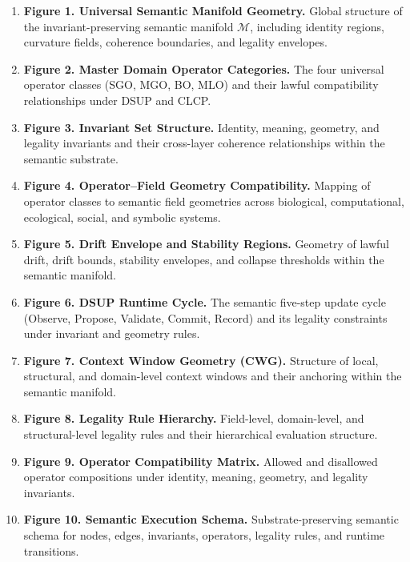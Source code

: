 
\begin{enumerate}
    \item \textbf{Figure 1. Universal Semantic Manifold Geometry.}  
    Global structure of the invariant-preserving semantic manifold $\mathcal{M}$,
    including identity regions, curvature fields, coherence boundaries, and
    legality envelopes.

    \item \textbf{Figure 2. Master Domain Operator Categories.}  
    The four universal operator classes (SGO, MGO, BO, MLO) and their lawful
    compatibility relationships under DSUP and CLCP.

    \item \textbf{Figure 3. Invariant Set Structure.}  
    Identity, meaning, geometry, and legality invariants and their cross-layer
    coherence relationships within the semantic substrate.

    \item \textbf{Figure 4. Operator–Field Geometry Compatibility.}  
    Mapping of operator classes to semantic field geometries across biological,
    computational, ecological, social, and symbolic systems.

    \item \textbf{Figure 5. Drift Envelope and Stability Regions.}  
    Geometry of lawful drift, drift bounds, stability envelopes, and collapse
    thresholds within the semantic manifold.

    \item \textbf{Figure 6. DSUP Runtime Cycle.}  
    The semantic five-step update cycle (Observe, Propose, Validate, Commit,
    Record) and its legality constraints under invariant and geometry rules.

    \item \textbf{Figure 7. Context Window Geometry (CWG).}  
    Structure of local, structural, and domain-level context windows and their
    anchoring within the semantic manifold.

    \item \textbf{Figure 8. Legality Rule Hierarchy.}  
    Field-level, domain-level, and structural-level legality rules and their
    hierarchical evaluation structure.

    \item \textbf{Figure 9. Operator Compatibility Matrix.}  
    Allowed and disallowed operator compositions under identity, meaning,
    geometry, and legality invariants.

    \item \textbf{Figure 10. Semantic Execution Schema.}  
    Substrate-preserving semantic schema for nodes, edges, invariants,
    operators, legality rules, and runtime transitions.
\end{enumerate}
